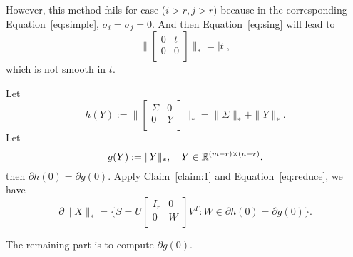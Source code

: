 However,
this method fails for case ($i>r, j>r$)
because in the corresponding Equation~\eqref{eq:simple},
$\sigma_i=\sigma_j=0$.
And then Equation~\eqref{eq:sing} will lead to
\begin{equation}
    \bigg\|\begin{bmatrix}
        0 & t \\
        0 & 0 \\
    \end{bmatrix}\bigg\|_*=|t|,
\end{equation}
which is not smooth in $t$.

Let
\begin{equation}
    h(Y):=\bigg\|\begin{bmatrix}
            \Sigma & 0 \\
            0      & Y \\
        \end{bmatrix}\bigg\|_*
        =\|\Sigma\|_*+\|Y\|_*.
\end{equation}
Let
\begin{equation}
    g(Y):=\|Y\|_*,\quad Y\in{\mathbb{R}}^{(m-r)\times(n-r)}.
\end{equation}
then $\partial h(0)=\partial g(0)$.
Apply Claim~\ref{claim:1} and Equation~\eqref{eq:reduce},
we have
\begin{equation}
    \partial \|X\|_*=\bigg\{
        S=U\begin{bmatrix}
            I_r & 0 \\
            0   & W \\
        \end{bmatrix}V^T:W\in\partial h(0)=\partial g(0)
        \bigg\}.
\end{equation}

The remaining part is to compute $\partial g(0)$.

